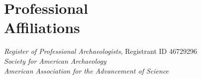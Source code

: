 \section{Professional \\ Affiliations}
\emph{Register of Professional Archaeologists}, Registrant ID 46729296\\
\emph{Society for American Archaeology}\\
\emph{American Association for the Advancement of Science}\\
